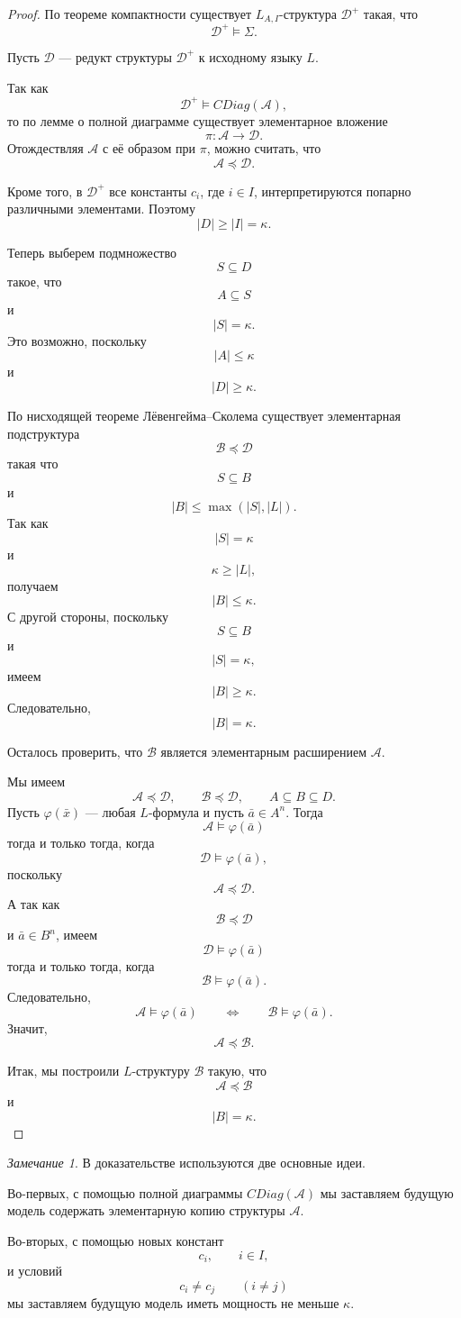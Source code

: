 \documentclass[12pt,a4paper,oneside,openany]{book}
\theoremstyle{definition}
\theoremstyle{plain}
\theoremstyle{remark}
\newtheorem{remark}{Замечание}[chapter]
\begin{document}
\begin{proof}
По теореме компактности существует $L_{A,I}$-структура $\mathcal D^+$ такая, что
\[
\mathcal D^+\models\Sigma.
\]

Пусть $\mathcal D$ — редукт структуры $\mathcal D^+$ к исходному языку $L$.

Так как
\[
\mathcal D^+\models CDiag(\mathcal A),
\]
то по лемме о полной диаграмме существует элементарное вложение
\[
\pi:\mathcal A\to\mathcal D.
\]
Отождествляя $\mathcal A$ с её образом при $\pi$, можно считать, что
\[
\mathcal A\preccurlyeq\mathcal D.
\]

Кроме того, в $\mathcal D^+$ все константы $c_i$, где $i\in I$, интерпретируются попарно различными элементами. Поэтому
\[
|D|\ge |I|=\kappa.
\]

Теперь выберем подмножество
\[
S\subseteq D
\]
такое, что
\[
A\subseteq S
\]
и
\[
|S|=\kappa.
\]
Это возможно, поскольку
\[
|A|\le\kappa
\]
и
\[
|D|\ge\kappa.
\]

По нисходящей теореме Лёвенгейма--Сколема существует элементарная подструктура
\[
\mathcal B\preccurlyeq\mathcal D
\]
такая что
\[
S\subseteq B
\]
и
\[
|B|\le \max(|S|,|L|).
\]
Так как
\[
|S|=\kappa
\]
и
\[
\kappa\ge |L|,
\]
получаем
\[
|B|\le\kappa.
\]
С другой стороны, поскольку
\[
S\subseteq B
\]
и
\[
|S|=\kappa,
\]
имеем
\[
|B|\ge\kappa.
\]
Следовательно,
\[
|B|=\kappa.
\]

Осталось проверить, что $\mathcal B$ является элементарным расширением $\mathcal A$.

Мы имеем
\[
\mathcal A\preccurlyeq\mathcal D,
\qquad
\mathcal B\preccurlyeq\mathcal D,
\qquad
A\subseteq B\subseteq D.
\]
Пусть $\varphi(\bar x)$ — любая $L$-формула и пусть $\bar a\in A^n$. Тогда
\[
\mathcal A\models\varphi(\bar a)
\]
тогда и только тогда, когда
\[
\mathcal D\models\varphi(\bar a),
\]
поскольку
\[
\mathcal A\preccurlyeq\mathcal D.
\]
А так как
\[
\mathcal B\preccurlyeq\mathcal D
\]
и $\bar a\in B^n$, имеем
\[
\mathcal D\models\varphi(\bar a)
\]
тогда и только тогда, когда
\[
\mathcal B\models\varphi(\bar a).
\]
Следовательно,
\[
\mathcal A\models\varphi(\bar a)
\qquad
\Longleftrightarrow
\qquad
\mathcal B\models\varphi(\bar a).
\]
Значит,
\[
\mathcal A\preccurlyeq\mathcal B.
\]

Итак, мы построили $L$-структуру $\mathcal B$ такую, что
\[
\mathcal A\preccurlyeq\mathcal B
\]
и
\[
|B|=\kappa.
\]
\end{proof}

\begin{remark}
В доказательстве используются две основные идеи.

Во-первых, с помощью полной диаграммы $CDiag(\mathcal A)$ мы заставляем будущую модель содержать элементарную копию структуры $\mathcal A$.

Во-вторых, с помощью новых констант
\[
c_i,\qquad i\in I,
\]
и условий
\[
c_i\ne c_j
\qquad
(i\ne j)
\]
мы заставляем будущую модель иметь мощность не меньше $\kappa$.
\end{remark}
\end{document}
